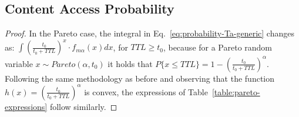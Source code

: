 \documentclass[journal]{IEEEtran}
\newcommand{\eq}[1]{Eq.~\eqref{#1}}
\begin{document}
\subsection{Content Access Probability}
\begin{proof}
In the Pareto case, the integral in \eq{eq:probability-Ta-generic} changes as: $\int \left(\frac{t_{0}}{t_{0}+TTL}\right)^{x}\cdot f_{m\alpha}(x)dx$, for $TTL\geq t_{0}$, because for a Pareto random variable $x\sim Pareto(\alpha, t_{0})$ it holds that $P\{x\leq TTL\}=1-\left(\frac{t_{0}}{t_{0}+TTL}\right)^{\alpha}$. Following the same methodology as before and observing that the function $h(x) = \left(\frac{t_{0}}{t_{0}+TTL}\right)^{\alpha}$ is convex, the expressions of Table~\ref{table:pareto-expressions} follow similarly.
\end{proof}
\end{document}
